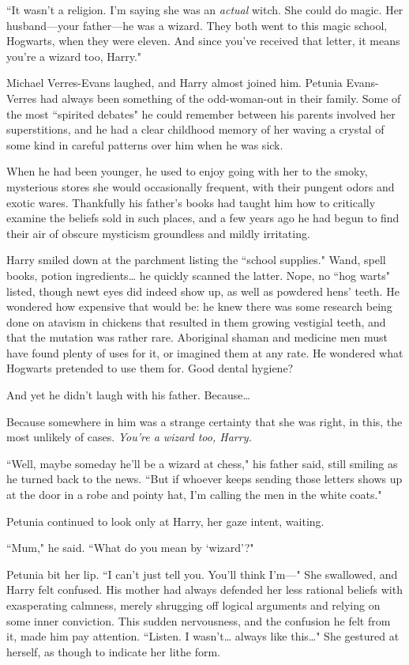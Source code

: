 ``It wasn't a religion. I'm saying she was an \emph{actual} witch. She could do magic. Her husband---your father---he was a wizard. They both went to this magic school, Hogwarts, when they were eleven. And since you've received that letter, it means you're a wizard too, Harry."

Michael Verres-Evans laughed, and Harry almost joined him. Petunia Evans-Verres had always been something of the odd-woman-out in their family. Some of the most ``spirited debates" he could remember between his parents involved her superstitions, and he had a clear childhood memory of her waving a crystal of some kind in careful patterns over him when he was sick.

When he had been younger, he used to enjoy going with her to the smoky, mysterious stores she would occasionally frequent, with their pungent odors and exotic wares. Thankfully his father's books had taught him how to critically examine the beliefs sold in such places, and a few years ago he had begun to find their air of obscure mysticism groundless and mildly irritating.

Harry smiled down at the parchment listing the ``school supplies." Wand, spell books, potion ingredients{\ldots} he quickly scanned the latter. Nope, no ``hog warts" listed, though newt eyes did indeed show up, as well as powdered hens' teeth. He wondered how expensive that would be: he knew there was some research being done on atavism in chickens that resulted in them growing vestigial teeth, and that the mutation was rather rare. Aboriginal shaman and medicine men must have found plenty of uses for it, or imagined them at any rate. He wondered what Hogwarts pretended to use them for. Good dental hygiene?

And yet he didn't laugh with his father. Because{\ldots}

Because somewhere in him was a strange certainty that she was right, in this, the most unlikely of cases. \emph{You're a wizard too, Harry.}

``Well, maybe someday he'll be a wizard at chess," his father said, still smiling as he turned back to the news. ``But if whoever keeps sending those letters shows up at the door in a robe and pointy hat, I'm calling the men in the white coats."

Petunia continued to look only at Harry, her gaze intent, waiting.

``Mum," he said. ``What do you mean by `wizard'?"

Petunia bit her lip. ``I can't just tell you. You'll think I'm---" She swallowed, and Harry felt confused. His mother had always defended her less rational beliefs with exasperating calmness, merely shrugging off logical arguments and relying on some inner conviction. This sudden nervousness, and the confusion he felt from it, made him pay attention. ``Listen. I wasn't{\ldots} always like this{\ldots}" She gestured at herself, as though to indicate her lithe form.

